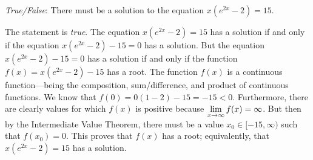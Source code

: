 \documentclass[11pt,letterpaper]{article}
\begin{document}
\thispagestyle{title}

\quizsol \textit{True/False}: There must be a solution to the equation $x \left( e^{2x} - 2 \right)= 15$.  \pspace

\sol The statement is \textit{true}. The equation $x \left( e^{2x} - 2 \right)= 15$ has a solution if and only if the equation $x \left( e^{2x} - 2 \right) - 15= 0$ has a solution. But the equation $x \left( e^{2x} - 2 \right) - 15= 0$ has a solution if and only if the function $f(x)= x \left( e^{2x} - 2 \right) - 15$ has a root. The function $f(x)$ is a continuous function---being the composition, sum/difference, and product of continuous functions. We know that $f(0)= 0 (1 - 2) - 15= -15 < 0$. Furthermore, there are clearly values for which $f(x)$ is positive because $\displaystyle \lim_{x \to \infty} f(x)= \infty$. But then by the Intermediate Value Theorem, there must be a value $x_0 \in [-15, \infty)$ such that $f(x_0)= 0$. This proves that $f(x)$ has a root; equivalently, that $x \left( e^{2x} - 2 \right)= 15$ has a solution. 
\end{document}
